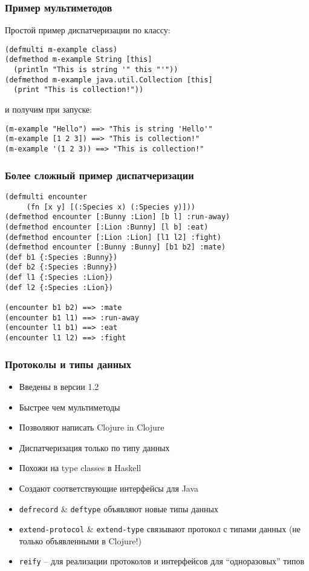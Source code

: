 \documentclass[ignorenonframetext]{beamer}
\begin{document}
\begin{frame}[fragile,t]
  \frametitle{Пример мультиметодов}
Простой пример диспатчеризации по классу:
\begin{lstlisting}
(defmulti m-example class)
(defmethod m-example String [this]
  (println "This is string '" this "'"))
(defmethod m-example java.util.Collection [this]
  (print "This is collection!"))
\end{lstlisting}
и получим при запуске:
\begin{lstlisting}
(m-example "Hello") ==> "This is string 'Hello'"
(m-example [1 2 3]) ==> "This is collection!"
(m-example '(1 2 3)) ==> "This is collection!"
\end{lstlisting}
\end{frame}

\begin{frame}[fragile]
  \frametitle{Более сложный пример диспатчеризации}
\begin{lstlisting}
(defmulti encounter 
     (fn [x y] [(:Species x) (:Species y)]))
(defmethod encounter [:Bunny :Lion] [b l] :run-away)
(defmethod encounter [:Lion :Bunny] [l b] :eat)
(defmethod encounter [:Lion :Lion] [l1 l2] :fight)
(defmethod encounter [:Bunny :Bunny] [b1 b2] :mate)
(def b1 {:Species :Bunny})
(def b2 {:Species :Bunny})
(def l1 {:Species :Lion})
(def l2 {:Species :Lion})

(encounter b1 b2) ==> :mate
(encounter b1 l1) ==> :run-away
(encounter l1 b1) ==> :eat
(encounter l1 l2) ==> :fight
\end{lstlisting}
\end{frame}


\begin{frame}[t]
  \frametitle{Протоколы и типы данных}
  \begin{itemize}
  \item Введены в версии 1.2
  \item Быстрее чем мультиметоды
  \item Позволяют написать Clojure in Clojure
  \item Диспатчеризация только по типу данных
  \item Похожи на type classes в Haskell
  \item Создают соответствующие интерфейсы для Java
  \item \texttt{defrecord} \& \texttt{deftype} объявляют новые типы данных
  \item \texttt{extend-protocol} \& \texttt{extend-type} связывают протокол с типами
    данных (не только объявленными в Clojure!)
  \item \texttt{reify} -- для реализации протоколов и интерфейсов для ``одноразовых'' типов
  \end{itemize}
\end{frame}
\end{document}
